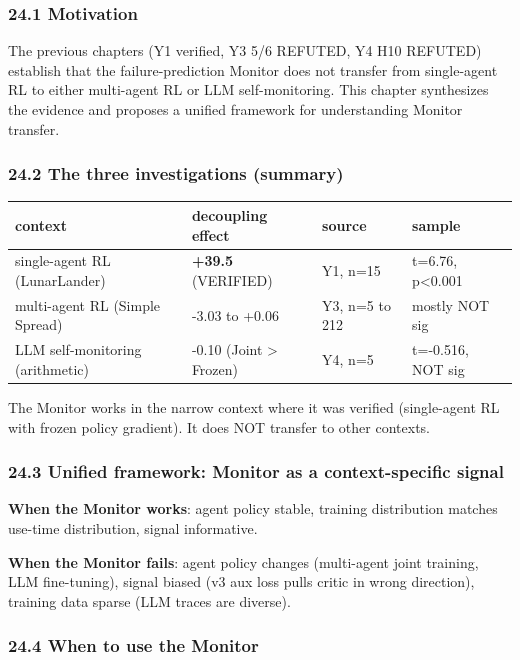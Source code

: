 \documentclass[11pt]{article}
\begin{document}
\subsubsection{24.1 Motivation}

The previous chapters (Y1 verified, Y3 5/6 REFUTED, Y4 H10
REFUTED) establish that the failure-prediction Monitor does not
transfer from single-agent RL to either multi-agent RL or LLM
self-monitoring. This chapter synthesizes the evidence and
proposes a unified framework for understanding Monitor transfer.

\subsubsection{24.2 The three investigations (summary)}

\begin{tabular}{llll}
context & decoupling effect & source & sample \\
\hline
single-agent RL (LunarLander) & \textbf{+39.5} (VERIFIED) & Y1, n=15 & t=6.76, p<0.001 \\
multi-agent RL (Simple Spread) & -3.03 to +0.06 & Y3, n=5 to 212 & mostly NOT sig \\
LLM self-monitoring (arithmetic) & -0.10 (Joint > Frozen) & Y4, n=5 & t=-0.516, NOT sig \\
\end{tabular}


The Monitor works in the narrow context where it was verified
(single-agent RL with frozen policy gradient). It does NOT
transfer to other contexts.

\subsubsection{24.3 Unified framework: Monitor as a context-specific signal}

\textbf{When the Monitor works}: agent policy stable, training
distribution matches use-time distribution, signal informative.

\textbf{When the Monitor fails}: agent policy changes (multi-agent
joint training, LLM fine-tuning), signal biased (v3 aux loss
pulls critic in wrong direction), training data sparse (LLM
traces are diverse).

\subsubsection{24.4 When to use the Monitor}
\end{document}

